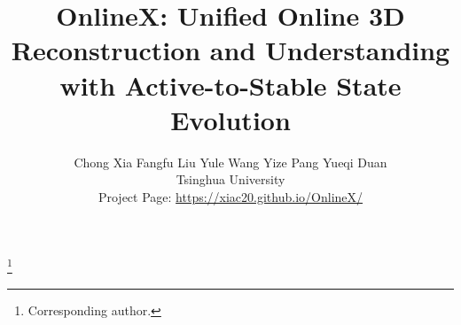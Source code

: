 \documentclass[10pt,twocolumn,letterpaper]{article}
\title{OnlineX: Unified Online 3D Reconstruction and Understanding \\
with Active-to-Stable State Evolution}
\begin{document}
\vspace{-3mm}
\author{
Chong Xia \quad
Fangfu Liu \quad
Yule Wang \quad
Yize Pang  \quad
Yueqi Duan\corrauthor\\
Tsinghua University \\
Project Page: \url{https://xiac20.github.io/OnlineX/}
}



\maketitle


\begingroup
\renewcommand\thefootnote{} %
\footnote{\corrauthor Corresponding author.}
\endgroup

    





% 

% 
{
    \small
    
    
}

\end{document}
